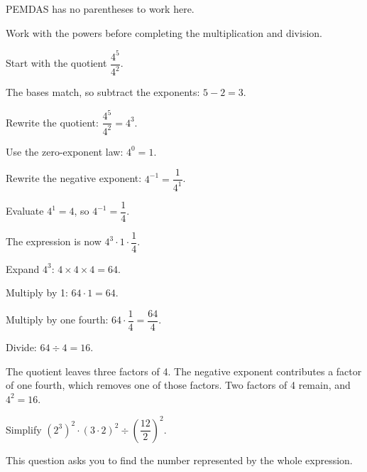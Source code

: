 \begin{steps}
  \item PEMDAS has no parentheses to work here.
  \item Work with the powers before completing the multiplication and division.
  \item Start with the quotient $\dfrac{4^{5}}{4^{2}}$.
  \item The bases match, so subtract the exponents: $5 - 2 = 3$.
  \item Rewrite the quotient: $\dfrac{4^{5}}{4^{2}} = 4^{3}$.
  \item Use the zero-exponent law: $4^{0} = 1$.
  \item Rewrite the negative exponent: $4^{-1} = \dfrac{1}{4^{1}}$.
  \item Evaluate $4^{1} = 4$, so $4^{-1} = \dfrac{1}{4}$.
  \item The expression is now $4^{3} \cdot 1 \cdot \dfrac{1}{4}$.
  \item Expand $4^{3}$: $4 \times 4 \times 4 = 64$.
  \item Multiply by 1: $64 \cdot 1 = 64$.
  \item Multiply by one fourth: $64 \cdot \dfrac{1}{4} = \dfrac{64}{4}$.
  \item Divide: $64 \div 4 = 16$.
\end{steps}


The quotient leaves three factors of 4. The negative exponent contributes a
factor of one fourth, which removes one of those factors. Two factors of 4
remain, and $4^{2} = 16$.


Simplify $(2^{3})^{2} \cdot (3 \cdot 2)^{2} \div \left(\dfrac{12}{2}\right)^{2}$.


This question asks you to find the number represented by the whole expression.

